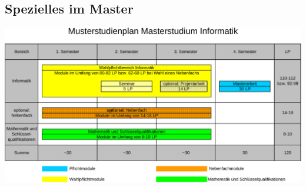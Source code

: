 \begin{multicols}{2}
\section{Spezielles im Master}
	\label{master}
\end{multicols}
	
\begin{minipage}{1.0\linewidth}
	\begin{center}     
 		\includegraphics[width=\textwidth,totalheight=0.5\textheight ]{bilder/Musterstudienplan_MSc_2010.pdf}
	\end{center} 
\end{minipage}

